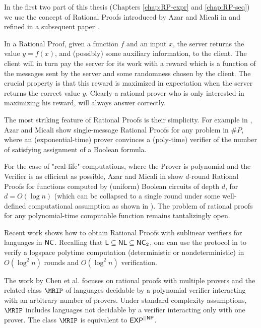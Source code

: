 In the first two part of this thesis (Chapters \ref{chap:RP-expr} and \ref{chap:RP-seq}) we use the concept of {\sf Rational Proofs} introduced by Azar and Micali in \cite{am} and refined in a subsequent paper \cite{am1}. 

In a Rational Proof, given a function $f$ and an input $x$, the server returns the value $y=f(x)$, and (possibly) some auxiliary information, to the client. The client will in turn 
pay the server for its work with a reward which is a function of the messages 
sent by the server and some randomness chosen by the client.  The crucial 
property is that this reward is maximized in expectation when the server 
returns the correct value $y$. Clearly a rational prover who is only interested 
in maximizing his reward, will always answer correctly. 

The most striking feature of Rational Proofs is their simplicity. For example in \cite{am}, Azar and Micali show {\sf single-message} Rational Proofs for any problem in $\#P$, where an (exponential-time) prover convinces a (poly-time) verifier of the number of satisfying assignment of a Boolean formula. 

For the case of "real-life" computations, where the Prover is polynomial and the Verifier is as efficient as possible, Azar and Micali in \cite{am1} show $d$-round Rational Proofs for functions computed by (uniform) Boolean circuits of depth $d$, for $d=O(\log n)$ (which can be collapsed to a single round under some well-defined computational assumption as shown in \cite{ratargs}). The problem of rational proofs for any polynomial-time computable function remains tantalizingly open. 


Recent work \cite{ratsumchecks} shows how to obtain Rational Proofs with sublinear verifiers for languages in ${\mathsf{NC}}$. Recalling that ${\mathsf{L}} \subseteq {\ensuremath{\mathsf{NL}}} \subseteq {\ensuremath{\mathsf{NC}}}_2$, one can use the protocol  in \cite{ratsumchecks} to verify a logspace polytime computation (deterministic or nondeterministic) in $O(\log^2 n )$ rounds and $O(\log^2 n )$ verification.

The work by Chen et al. \cite{chen2016rational} focuses on rational proofs with multiple provers and the related class $\MRIP$ of languages decidable by a polynomial verifier interacting with an arbitrary number of provers. Under standard complexity assumptions, $\MRIP$ includes languages not decidable by a verifier interacting only with one prover. The class $\MRIP$ is equivalent to ${\mathsf{EXP}}^{||{\mathsf{NP}}}$.



